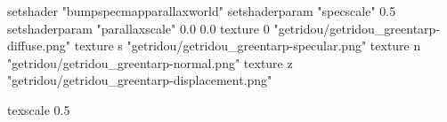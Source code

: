 setshader "bumpspecmapparallaxworld"
setshaderparam "specscale" 0.5
setshaderparam "parallaxscale" 0.0 0.0
texture 0 "getridou/getridou_greentarp-diffuse.png"
texture s "getridou/getridou_greentarp-specular.png"
texture n "getridou/getridou_greentarp-normal.png"
texture z "getridou/getridou_greentarp-displacement.png"

texscale 0.5
